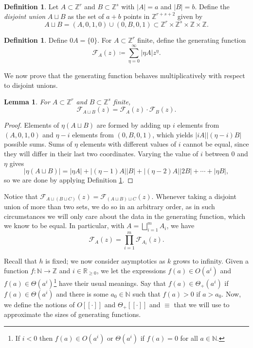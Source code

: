 \documentclass[10pt,a4paper]{article}
\newtheorem{lemma}[theorem]{Lemma}
\theoremstyle{definition}
\newtheorem{definition}[theorem]{Definition}
\theoremstyle{remark}
\numberwithin{equation}{section}
\numberwithin{theorem}{section}
\newcommand{\N}{\mathbb{N}}
\newcommand{\R}{\mathbb{R}}
\newcommand{\Z}{\mathbb{Z}}
\newcommand{\calf}{\mathcal{F}}
\begin{document}
\begin{definition}\label{defDisjointUnion}
    Let $A \subset \Z^r$ and $B \subset \Z^s$ with $|A| = a$ and $|B| = b$. Define the \emph{disjoint union} $A \sqcup B$ as the set of $a+b$ points in $\Z^{r+s+2}$ given by \[A \sqcup B = (A,0,1,0) \cup (0,B,0,1) \subset \Z^r \times \Z^s \times \Z \times \Z.\]
\end{definition}

\begin{definition}\label{defGenFunc}
    Define $0A = \{0\}$. For $A \subset \Z^r$ finite, define the generating function \[\mathcal{F}_A(z) \coloneq \sum_{\eta=0}^{\infty} |\eta A|z^\eta.\]
\end{definition}
We now prove that the generating function behaves multiplicatively with respect to disjoint unions.

\begin{lemma}\label{lemmagenfunc} For $A \subset \Z^r$ and $B\subset \Z^s$ finite,
    \[\mathcal{F}_{A \sqcup B}(z) = \mathcal{F}_A(z) \cdot \mathcal{F}_B(z).\]
\end{lemma}
\begin{proof}
    Elements of $\eta (A \sqcup B)$ are formed by adding up $i$ elements from $(A,0,1,0)$ and $\eta -i$ elements from $(0,B,0,1)$, which yields $|iA||(\eta -i)B|$ possible sums. Sums of $\eta$ elements with different values of $i$ cannot be equal, since they will differ in their last two coordinates. Varying the value of $i$ between $0$ and $\eta $ gives \[|\eta (A \sqcup B)| = |\eta A|+|(\eta -1)A||B| + |(\eta -2)A||2B|+\cdots+|\eta B|,\] so we are done by applying Definition \ref{defGenFunc}.
\end{proof}

Notice that $\calf_{A \sqcup(B \sqcup C)}(z) = \calf_{(A \sqcup B)\sqcup C}(z)$. Whenever taking a disjoint union of more than two sets, we do so in an arbitrary order, as in such circumstances we will only care about the data in the generating function, which we know to be equal. In particular, with $A = \displaystyle\bigsqcup_{i=1}^m {A_{i}}$, we have \[\calf_A(z) = \prod_{i=1}^m \calf_{A_{i}}(z).\]

Recall that $h$ is fixed; we now consider asymptotics as $k$ grows to infinity. Given a function $f: \N \to \Z$ and $i \in \R_{\geq 0}$, we let the expressions $f(a) \in O(a^i)$ and $f(a) \in \Theta(a^i)$\footnote{If $i <0$ then $f(a) \in O(a^i)$ or $\Theta(a^i)$ if $f(a) = 0$ for all $a \in \N$.} have their usual meanings. Say that $f(a) \in \Theta_+(a^i)$ if $f(a) \in \Theta(a^i)$ and there is some $a_0 \in \N$ such that $f(a) > 0$ if $a > a_0$. 
 Now, we define the notions of $O[[\cdot]]$ and $\Theta_+[[\cdot]]$ and $\equiv$ that we will use to approximate the sizes of generating functions.
\end{document}
